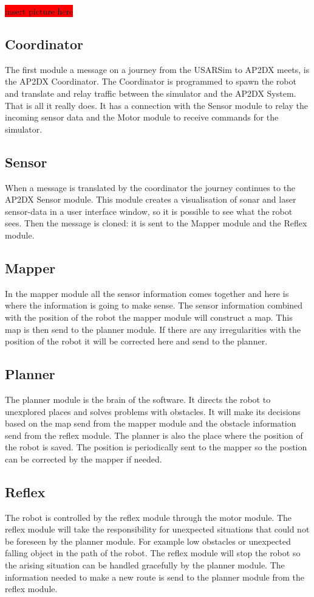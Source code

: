 \documentclass[titlepage, a4paper,10pt]{article}
\newcommand{\todo}[1]{\colorbox{red}{\color{white}#1}}
\begin{document}
\todo{insert picture here}

\subsection{Coordinator}
The first module a message on a journey from the USARSim to AP2DX meets, is the AP2DX Coordinator. The Coordinator is programmed to spawn the robot and translate and relay traffic between the simulator and the AP2DX System. That is all it really does. It has a connection with the Sensor module to relay the incoming sensor data and the Motor module to receive commands for the simulator.

\subsection{Sensor}
When a message is translated by the coordinator the journey continues to the AP2DX Sensor module. This module creates a visualisation of sonar and laser sensor-data in a user interface window, so it is possible to see what the robot sees. Then the message is cloned: it is sent to the Mapper module and the Reflex module.

\subsection{Mapper}
In the mapper module all the sensor information comes together and here is where the information is going to make sense. The sensor information combined with the position of the robot the mapper module will construct a map. This map is then send to the planner module. If there are any irregularities with the position of the robot it will be corrected here and send to the planner.

\subsection{Planner}
The planner module is the brain of the software. It directs the robot to unexplored places and solves problems with obstacles. It will make its decisions based on the map send from the mapper module and the obstacle information send from the reflex module. The planner is also the place where the position of the robot is saved. The position is periodically sent to the mapper so the postion can be corrected by the mapper if needed.

\subsection{Reflex}
The robot is controlled by the reflex module through the motor module. The reflex module will take the responsibility for unexpected situations that could not be foreseen by the planner module. For example low obstacles or unexpected falling object in the path of the robot. The reflex module will stop the robot so the arising situation can be handled gracefully by the planner module. The information needed to make a new route is send to the planner module from the reflex module.
\end{document}

